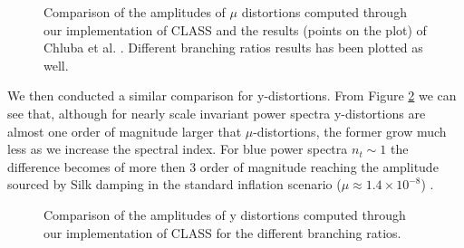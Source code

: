 \begin{figure}
    \centering
{}
\caption{Comparison of the amplitudes of $\mu$ distortions computed through our implementation of CLASS and the results (points on the plot) of Chluba et al. \cite{Chluba_tens_diss}. Different branching ratios results has been plotted as well. }
\label{fig:mu_amplitudes}
\end{figure}
We then conducted a similar comparison for y-distortions. From Figure \ref{fig:y_amplitudes} we can see that, although for nearly scale invariant power spectra y-distortions are almost one order of magnitude larger that $\mu$-distortions, the former grow much less as we increase the spectral index. For blue power spectra $n_t\sim 1$ the difference becomes of more then 3 order of magnitude reaching the amplitude sourced by Silk damping in the standard inflation scenario ($\mu\approx1.4\times10^{-8}$) \cite{Chluba_2x2}.  
\begin{figure}
    \centering
{}
\caption{Comparison of the amplitudes of y distortions computed through our implementation of CLASS for the different branching ratios. }
\label{fig:y_amplitudes}
\end{figure}


